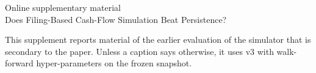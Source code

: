\documentclass[preprint,12pt,authoryear]{elsarticle}
\begin{document}
\begin{center}\Large Online supplementary material\\[4pt]\large Does Filing-Based Cash-Flow Simulation Beat Persistence?\end{center}
\noindent This supplement reports material of the earlier evaluation of the simulator that is secondary to the paper. Unless a caption says otherwise, it uses v3 with walk-forward hyper-parameters on the frozen snapshot.




\end{document}
